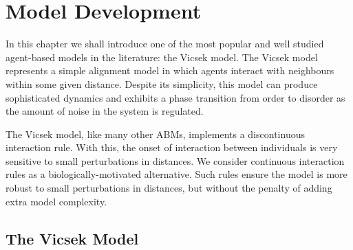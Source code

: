 \graphicspath{{fig/model_development/}}

\chapter{Model Development}
\label{cha:model_dev}

In this chapter we shall introduce one of the most popular and well studied agent-based
models in the literature: the Vicsek model. The Vicsek model represents a simple alignment
model in which agents interact with neighbours within some given distance. Despite its
simplicity, this model can produce sophisticated dynamics and exhibits a phase
transition from order to disorder as the amount of noise in the system is regulated.

The Vicsek model, like many other ABMs, implements a discontinuous interaction rule. With
this, the onset of interaction between individuals is very sensitive to small
perturbations in distances. We consider continuous interaction rules as a
biologically-motivated alternative. Such rules ensure the model is more robust to small
perturbations in distances, but without the penalty of adding extra model complexity.

\section{The Vicsek Model}

